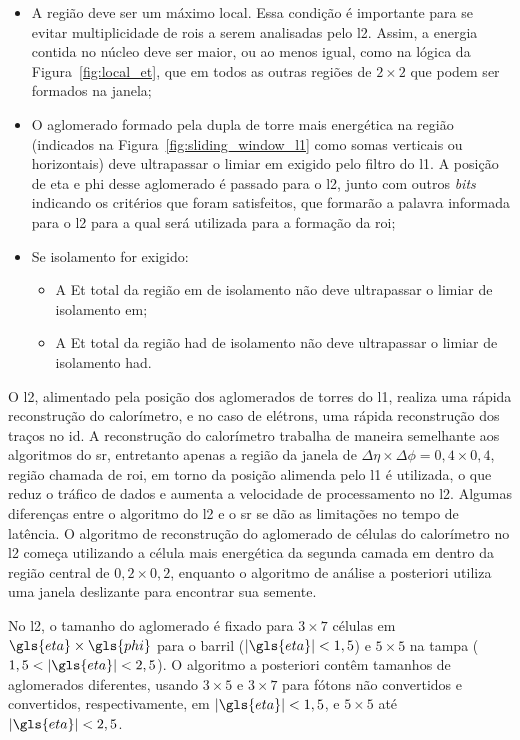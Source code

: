 \begin{itemize}
\item A região deve ser um máximo local. Essa condição é importante para se
evitar multiplicidade de \glspl{roi} a serem analisadas pelo \gls{l2}.
Assim, a energia contida no núcleo deve ser
maior, ou ao menos igual, como na lógica da Figura~\ref{fig:local_et}, 
que em todos as outras regiões de $2\times2$ que podem ser formados na
janela;
\item O aglomerado formado pela dupla de torre mais energética na região
(indicados na Figura~\ref{fig:sliding_window_l1} como somas verticais ou horizontais) deve ultrapassar o limiar
\gls{em} exigido pelo filtro do \gls{l1}. A posição de \gls{eta} e \gls{phi} desse aglomerado é passado
para o \gls{l2}, junto com outros \emph{bits} indicando os critérios que foram
satisfeitos, que formarão a palavra informada para o \gls{l2} para a qual será
utilizada para a formação da \gls{roi};
\item Se isolamento for exigido: 
\begin{itemize}
\item A \gls{Et} total da região \gls{em} de
isolamento não deve ultrapassar o limiar de isolamento \gls{em};
\item A \gls{Et} total da região \gls{had} de isolamento não deve ultrapassar o
limiar de isolamento \gls{had}.
\end{itemize}
\end{itemize}


O \gls{l2}, alimentado pela posição dos
aglomerados de torres do \gls{l1}, realiza uma rápida reconstrução do
calorímetro, e no caso de elétrons, uma rápida reconstrução dos traços no \gls{id}. A
reconstrução do calorímetro trabalha de maneira semelhante aos algoritmos do
\gls{sr}, entretanto apenas a região da janela de $\Delta\eta\times\Delta\phi =
0,4 \times 0,4$, região chamada de \gls{roi}, em torno da posição alimenda pelo \gls{l1} 
é utilizada, o que reduz o tráfico de dados e aumenta a velocidade de processamento no \gls{l2}.
Algumas diferenças entre o algoritmo do \gls{l2} e o \gls{sr} se dão as
limitações no tempo de latência. O algoritmo de reconstrução do aglomerado de
células do calorímetro no \gls{l2} começa utilizando a célula mais energética da
segunda camada \gls{em} dentro da região central de $0,2 \times 0,2$, enquanto o
algoritmo de análise a posteriori utiliza uma janela deslizante para encontrar
sua semente.

No \gls{l2}, o tamanho do aglomerado é fixado para $3
\times 7$ células em $\gls{eta} \times \gls{phi}$ para o barril ($|\gls{eta}|<1,5$) e 
$5 \times 5$ na tampa ($1,5<|\gls{eta}|<2,5$). O
algoritmo a posteriori contêm tamanhos de aglomerados diferentes, usando
$3\times5$ e $3\times7$ para fótons não convertidos e convertidos,
respectivamente, em $|\gls{eta}|<1,5$, e $5\times5$ até $|\gls{eta}|<2,5$.

